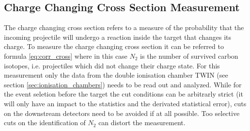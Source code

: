 \subsection{Charge Changing Cross Section Measurement}
The charge changing cross section refers to a measure of the probability that the incoming projectile will undergo a reaction inside the target that changes its charge. To measure the charge changing cross section it can be referred to formula \ref{eq:corr_cross} where in this case $N_2$ is the number of survived carbon isotopes, i.e. projectiles which did not change their charge state. For this measurement only the data from the double ionisation chamber TWIN (see section \ref{sec:ionisation_chambers}) needs to be read out and analyzed.\newline
While for the event seletion before the target the cut conditions can be arbitrarly strict (it will only have an impact to the statistics and the derivated statistical error), cuts on the downstream detectors need to be avoided if at all possible. Too selective cuts on the identification of $N_2$ can distort the measurement.
